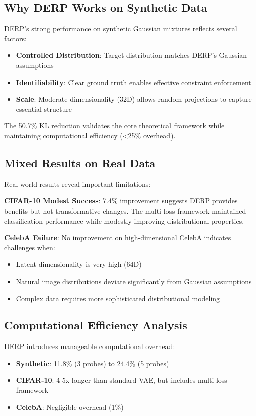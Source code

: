 \documentclass{article}
\begin{document}
\subsection{Why DERP Works on Synthetic Data}

DERP's strong performance on synthetic Gaussian mixtures reflects several factors:
\begin{itemize}
\item \textbf{Controlled Distribution}: Target distribution matches DERP's Gaussian assumptions
\item \textbf{Identifiability}: Clear ground truth enables effective constraint enforcement  
\item \textbf{Scale}: Moderate dimensionality (32D) allows random projections to capture essential structure
\end{itemize}

The 50.7\% KL reduction validates the core theoretical framework while maintaining computational efficiency (<25\% overhead).

\subsection{Mixed Results on Real Data}

Real-world results reveal important limitations:

\textbf{CIFAR-10 Modest Success}: 7.4\% improvement suggests DERP provides benefits but not transformative changes. The multi-loss framework maintained classification performance while modestly improving distributional properties.

\textbf{CelebA Failure}: No improvement on high-dimensional CelebA indicates challenges when:
\begin{itemize}
\item Latent dimensionality is very high (64D)
\item Natural image distributions deviate significantly from Gaussian assumptions
\item Complex data requires more sophisticated distributional modeling
\end{itemize}

\subsection{Computational Efficiency Analysis}

DERP introduces manageable computational overhead:
\begin{itemize}
\item \textbf{Synthetic}: 11.8\% (3 probes) to 24.4\% (5 probes)
\item \textbf{CIFAR-10}: 4-5x longer than standard VAE, but includes multi-loss framework
\item \textbf{CelebA}: Negligible overhead (1\%)
\end{itemize}
\end{document}
